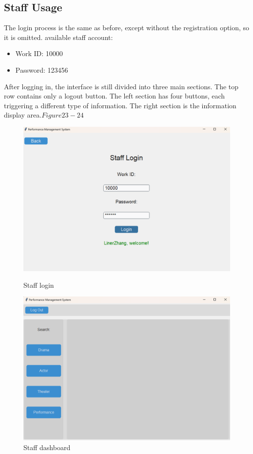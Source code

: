 \documentclass[12pt]{article}
\begin{document}
\subsection{Staff Usage}
\par The login process is the same as before, except without the registration option, so it is omitted.
available staff account:
\begin{itemize}
    \item Work ID: 10000
    \item Password: 123456
\end{itemize}
\par After logging in, the interface is still divided into three main sections. The top row contains only a logout button. The left section has four buttons, each triggering a different type of information. The right section is the information display area.\(Figure23-24\)
\begin{figure}[H]
    \centering
    \begin{minipage}{0.48\textwidth}
        \centering
        \includegraphics[width=\textwidth]{23.png}
        \caption{Staff login} 
        \label{Figure 23}
    \end{minipage}
    \hfill
    \begin{minipage}{0.48\textwidth}
        \centering
        \includegraphics[width=\textwidth]{24.png}
        \caption{Staff dashboard}
        \label{Figure 24}
    \end{minipage}
\end{figure}
\end{document}

